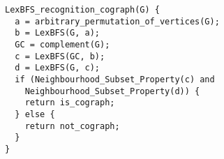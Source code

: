 \begin{verbatim}
LexBFS_recognition_cograph(G) {
  a = arbitrary_permutation_of_vertices(G);
  b = LexBFS(G, a);
  GC = complement(G);
  c = LexBFS(GC, b);
  d = LexBFS(G, c);
  if (Neighbourhood_Subset_Property(c) and
    Neighbourhood_Subset_Property(d)) {
    return is_cograph;
  } else {
    return not_cograph;
  }
}
\end{verbatim}